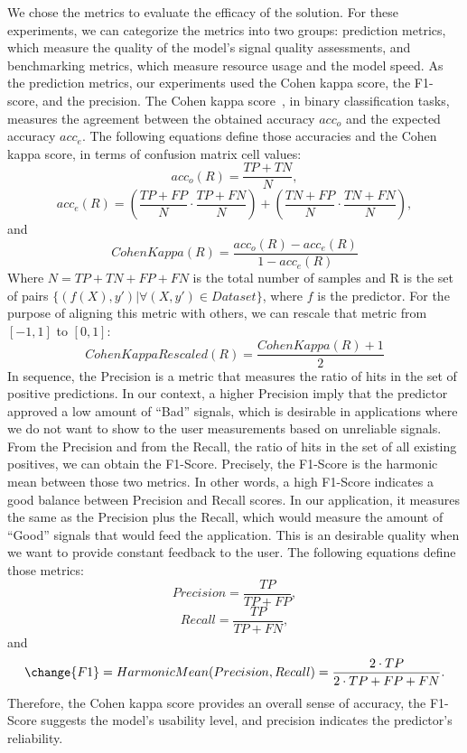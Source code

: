 We chose the metrics to evaluate the efficacy of the solution. For these experiments, we can categorize the metrics into two groups: prediction metrics, which measure the quality of the model's signal quality assessments, and benchmarking metrics, which measure resource usage and the model speed. As the prediction metrics, our experiments used the Cohen kappa score, the F1-score, and the precision. The Cohen kappa score~\cite{CohenKappa}, in binary classification tasks, measures the agreement between the obtained accuracy $acc_o$ and the expected accuracy $acc_e$. The following equations define those accuracies and the Cohen kappa score, in terms of confusion matrix cell values:
\begin{equation} 
acc_o(R) = \frac{TP+TN}{N},
\end{equation}
\begin{equation}
acc_e(R)  = \left(\frac{TP+FP}{N} \cdot \frac{TP+FN}{N}\right) + \left(\frac{TN+FP}{N} \cdot \frac{TN+FN}{N}\right),
\end{equation}
and
\begin{equation} \label{eq:Cohen kappa}
CohenKappa(R)  = \frac{acc_o(R) - acc_e(R)}{1 - acc_e(R)} 
\end{equation}  
\noindent Where $N=TP+TN+FP+FN$ is the total number of samples and R is the set of pairs $\{(f(X),y') | \forall (X,y') \in Dataset\}$, where $f$ is the predictor. For the purpose of aligning this metric with others, we can rescale that metric from $[-1,1]$ to $[0,1]$:
\begin{equation}
CohenKappaRescaled(R) = \frac{CohenKappa(R)+1}{2} 
\end{equation}  
In sequence, the Precision is a metric that measures the ratio of hits in the set of positive predictions. In our context, a higher Precision imply that the predictor approved a low amount of ``Bad'' signals, which is desirable in applications where we do not want to show to the user measurements based on unreliable signals. From the Precision and from the Recall, the ratio of hits in the set of all existing positives, we can obtain the F1-Score. Precisely, the F1-Score is the harmonic mean between those two metrics. In other words, a high F1-Score indicates a good balance between Precision and Recall scores. In our application, it measures the same as the Precision plus the Recall, which would measure the amount of ``Good'' signals that would feed the application. This is an desirable quality when we want to provide constant feedback to the user. The following equations define those metrics:
\begin{equation} \label{eq:Precision}
Precision = \frac{TP}{TP+FP},
\end{equation}
\begin{equation} \label{eq:Recall}
Recall = \frac{TP}{TP+FN},
\end{equation}
and
\begin{equation} \label{eq:F1-Score}
\change{F1} = HarmonicMean(Precision,Recall) = \frac{2 \cdot TP}{2 \cdot TP + FP + FN}.
\end{equation}
\noindent Therefore, the Cohen kappa score provides an overall sense of accuracy, the F1-Score suggests the model's usability level, and precision indicates the predictor's reliability.


